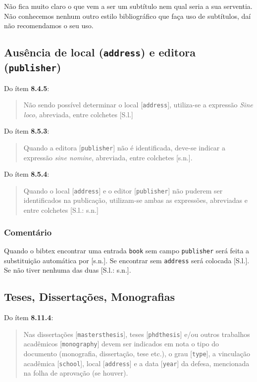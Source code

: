 \documentclass[a4paper]{ltxdoc}
\begin{document}
Não fica muito claro o que vem a ser um subtítulo nem qual seria a sua
serventia. Não conhecemos nenhum outro estilo bibliográfico que faça
uso de subtítulos, daí não recomendamos o seu uso.

\subsection{Ausência de local ({\tt address}) e editora ({\tt publisher})}

Do ítem {\bf 8.4.5}\cite{NBR6023:2000}:
\begin{quote}
Não sendo possível determinar o local [{\tt address}], utiliza-se a expressão \emph{Sine loco},
abreviada, entre colchetes [S.l.]
\end{quote}
Do ítem {\bf 8.5.3}\cite{NBR6023:2000}:
\begin{quote}
Quando a editora [{\tt publisher}] não é identificada, deve-se indicar a expressão
\emph{sine nomine}, abreviada, entre colchetes [s.n.].
\end{quote}
Do ítem {\bf 8.5.4}\cite{NBR6023:2000}:
\begin{quote}
Quando o local [{\tt address}] e o editor [{\tt publisher}] não puderem ser
identificados na publicação, utilizam-se ambas as expressões, abreviadas e
entre colchetes [S.l.: s.n.]
\end{quote}

\subsubsection{Comentário}
Quando o bibtex encontrar uma entrada {\tt book} sem campo {\tt publisher}
será feita a substituição automática por [s.n.].
\cite{8.5.3}
Se encontrar sem {\tt address} será colocada [S.l.]. \cite{8.4.5-1,8.4.5-2}
Se não tiver nenhuma das duas [S.l.: s.n.]. \cite{8.5.4}

\subsection{Teses, Dissertações, Monografias}
\label{sec-teses}

Do ítem {\bf 8.11.4}\cite{NBR6023:2000}:
\begin{quote}
Nas dissertações [{\tt mastersthesis}], teses [{\tt phdthesis}]
e/ou outros trabalhos acadêmicos [{\tt monography}] devem ser indicados
em nota o tipo do documento (monografia, dissertação, tese etc.), o grau [{\tt type}],
a vinculação acadêmica [{\tt school}], local [{\tt address}]
e a data [{\tt year}] da defesa, mencionada na folha de
aprovação (se houver). \cite{8.11.4-1,8.11.4-2,8.11.4-1b,8.11.4-1c}
\end{quote}
\end{document}
